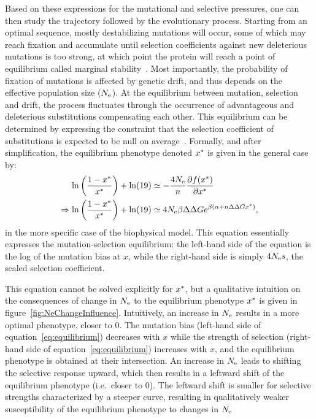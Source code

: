 Based on these expressions for the mutational and selective pressures, one can then study the trajectory followed by the evolutionary process.
Starting from an optimal sequence, mostly destabilizing mutations will occur, some of which may reach fixation and accumulate until selection coefficients against new deleterious mutations is too strong, at which point the protein will reach a point of equilibrium called marginal stability~\citep{Taverna2002, Bloom2007}.
Most importantly, the probability of fixation of mutations is affected by \gls{genetic drift}, and thus depends on the \gls{effective population size} ($N_{\text{e}}$).
At the equilibrium between mutation, selection and drift, the process fluctuates through the occurrence of advantageous and deleterious \glspl{substitution} compensating each other.
This equilibrium can be determined by expressing the constraint that the selection coefficient of \glspl{substitution} is expected to be null on average~\citep{Goldstein2013}.
Formally, and after simplification, the equilibrium \gls{phenotype} denoted $x^{*}$ is given in the general case by:
\begin{align}
    \ln \left( \frac{1 - x\eq}{x\eq} \right) + \ln (19) & \simeq - \frac{4\Ne}{\NbrSites} \frac{ \partial \logfit (x\eq) }{\partial {x\eq}} \\
    \Rightarrow \ln \left( \frac{1 - x\eq}{x\eq} \right) + \ln (19) & \simeq 4\Ne \beta \DeltaDeltaG e^{\beta (\DeltaGmin + \NbrSites \DeltaDeltaG x\eq)} \text{,} \label{eq:equilibrium}
\end{align}
in the more specific case of the biophysical model.
This equation essentially expresses the mutation-selection equilibrium: the left-hand side of the equation is the log of the mutation bias at $x$, while the right-hand side is simply $4 N_{\text{e}} s$, the scaled selection coefficient.

This equation cannot be solved explicitly for $x^{*}$, but a qualitative intuition on the consequences of change in $N_{\text{e}}$ to the equilibrium \gls{phenotype} $x^{*}$ is given in figure~\ref{fig:NeChangeInfluence}.
Intuitively, an increase in $N_{\text{e}}$ results in a more optimal \gls{phenotype}, closer to $0$.
The mutation bias (left-hand side of equation~\ref{eq:equilibrium}) decreases with $x$ while the strength of selection (right-hand side of equation~\ref{eq:equilibrium}) increases with $x$, and the equilibrium \gls{phenotype} is obtained at their intersection.
An increase in $N_{\text{e}}$ leads to shifting the selective response upward, which then results in a leftward shift of the equilibrium \gls{phenotype} (i.e.~closer to $0$).
The leftward shift is smaller for selective strengths characterized by a steeper curve, resulting in qualitatively weaker susceptibility of the equilibrium \gls{phenotype} to changes in $N_{\text{e}}$

